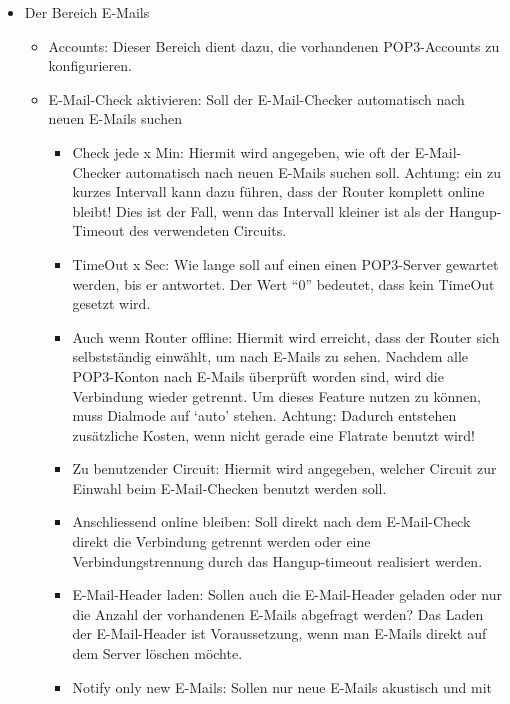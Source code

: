 \begin{itemize}
  \item Der Bereich \mbox{E-Mails}
    \begin{itemize}
      \item Accounts: Dieser Bereich dient dazu, die vorhandenen
        POP3-Accounts zu konfigurieren.
      \item \mbox{E-Mail}-Check aktivieren: Soll der \mbox{E-Mail}-Checker automatisch nach neuen
        \mbox{E-Mails} suchen
        \begin{itemize}
          \item Check jede x Min: Hiermit wird angegeben, wie oft der 
            \mbox{E-Mail}-Checker automatisch nach neuen \mbox{E-Mails} suchen soll. Achtung: ein 
            zu kurzes Intervall kann dazu führen, dass der Router komplett 
            online bleibt! Dies ist der Fall, wenn das Intervall kleiner ist als 
            der Hangup-Timeout des verwendeten Circuits.
          \item TimeOut x Sec: Wie lange soll auf einen einen POP3-Server 
            gewartet werden, bis er antwortet. Der Wert ``0'' bedeutet, dass 
            kein TimeOut gesetzt wird.
          \item Auch wenn Router offline: Hiermit wird erreicht, dass der Router 
            sich selbstständig einwählt, um nach \mbox{E-Mails} zu sehen. Nachdem alle 
            POP3-Konton nach \mbox{E-Mails} überprüft worden sind, wird die Verbindung 
            wieder getrennt. Um dieses Feature nutzen zu können, muss Dialmode 
            auf `auto' stehen. Achtung: Dadurch entstehen zusätzliche Kosten, 
            wenn nicht gerade eine Flatrate benutzt wird!
          \item Zu benutzender Circuit: Hiermit wird angegeben, welcher Circuit
            zur Einwahl beim \mbox{E-Mail}-Checken benutzt werden soll.
          \item Anschliessend online bleiben: Soll direkt nach dem \mbox{E-Mail}-Check 
            direkt die Verbindung getrennt werden oder eine 
            Verbindungstrennung durch das Hangup-timeout realisiert werden.
          \item \mbox{E-Mail}-Header laden: Sollen auch die \mbox{E-Mail}-Header geladen oder 
            nur die Anzahl der vorhandenen \mbox{E-Mails} abgefragt werden? Das Laden 
            der \mbox{E-Mail}-Header ist Voraussetzung, wenn man \mbox{E-Mails} direkt auf dem
            Server löschen möchte.
         \item Notify only new \mbox{E-Mails}: Sollen nur neue \mbox{E-Mails} akustisch und mit 

\end{itemize}
\end{itemize}
\end{itemize}
